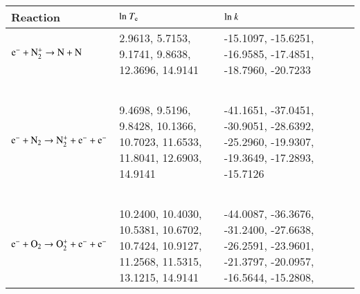 \documentclass{warpdoc}
\renewcommand{\fontsizetable}{\footnotesize\scalefont{0.9}}
\begin{document}
\begin{table}[!ht]
  \center\fontsizetable
  \begin{threeparttable}
    \label{tab:spline_tab}
    \fontsizetable
 
    \begin{tabular*}{\textwidth}{@{}l@{\extracolsep{\fill}}llll@{}}
    
    \toprule
    Reaction ~ & ${\rm ln}~T_{\rm e}$ & ${\rm ln}~k$ \\
        \midrule
        


   { $\rm e^- +  N_2^+ \rightarrow   N+N  $   } &  \begin{minipage}[t]{0.3\textwidth}\raggedright  
     2.9613,    5.7153,    9.1741,    9.8638,   12.3696,   14.9141
 \end{minipage}  & \begin{minipage}[t]{0.3\textwidth}\raggedright 
  -15.1097,  -15.6251, -16.9585,  -17.4851,  -18.7960,  -20.7233
\end{minipage} \\
~\\

 

   { $\rm e^- + N_2 \rightarrow N_{2}^+ +e^- + e^-$   } & \begin{minipage}[t]{0.3\textwidth}\raggedright  
       {  9.4698,    9.5196,    9.8428,   10.1366,   10.7023,   11.6533,   11.8041,   12.6903,   14.9141}


 \end{minipage}  & \begin{minipage}[t]{0.35\textwidth}\raggedright 
     {-41.1651,  -37.0451,  -30.9051,  -28.6392,  -25.2960,  -19.9307,  -19.3649,  -17.2893,  -15.7126}


\end{minipage} \\
~\\

   { $\rm e^- + O_2 \rightarrow O_{2}^+ +e^- + e^-$   } & \begin{minipage}[t]{0.3\textwidth}\raggedright  
    10.2400,   10.4030,   10.5381,   10.6702,   10.7424,   10.9127,   11.2568,   11.5315,   13.1215,   14.9141

 \end{minipage}  & \begin{minipage}[t]{0.35\textwidth}\raggedright 
   -44.0087,  -36.3676,  -31.2400,  -27.6638,  -26.2591,  -23.9601,  -21.3797,  -20.0957,  -16.5644,  -15.2808,


\end{minipage}
\end{tabular*}
\end{threeparttable}
\end{table}
\end{document}
